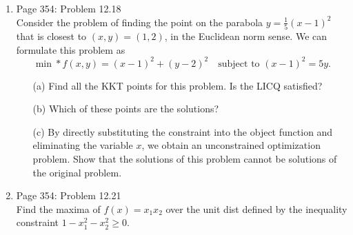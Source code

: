 \documentclass[11pt, oneside]{article}
\begin{document}
\begin{enumerate}
    \begin{proof}
      
    \end{proof}

  \item %
    Page 354: Problem 12.18 \\
    Consider the problem of finding the point on the parabola
    $y = \frac{1}{5}(x - 1)^2$ that is closest to $(x, y) = (1, 2)$, in the
    Euclidean norm sense.
    We can formulate this problem as
    \[
      \min*{f(x, y)} = (x - 1)^2 + (y - 2)^2 \quad \text{subject to } (x - 1)^2 = 5y.
    \]
    \begin{enumerate}
      \item[(a)]
        Find all the KKT points for this problem.
        Is the LICQ satisfied?

      \item[(b)]
        Which of these points are the solutions?

      \item[(c)]
        By directly substituting the constraint into the object function and
        eliminating the variable $x$, we obtain an unconstrained optimization
        problem.
        Show that the solutions of this problem cannot be solutions of the
        original problem.

    \end{enumerate}

  \item %
    Page 354: Problem 12.21 \\
    Find the maxima of $f(x) = x_1 x_2$ over the unit dist defined by the
    inequality constraint $1 - x_1^2 - x_2^2 \ge 0$.

\end{enumerate}
\end{document}
